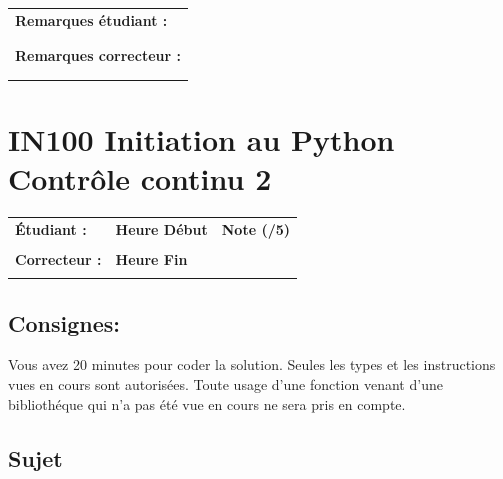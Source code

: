 \documentclass[a4paper,11pt]{article}
\begin{document}
\vspace{1 cm}

\begin{table}[h!]
\centering
\renewcommand{\arraystretch}{1.4} %
\begin{tabular}{|p{15cm}|}
\hline
\textbf{Remarques étudiant :}    \\
 \\
 \\
\hline
\textbf{Remarques correcteur :}  \\
 \\
 \\
\hline
\end{tabular}
\end{table}

\newpage

\section*{\center IN100 Initiation au Python\\
Contrôle continu 2}


\begin{table}[h!]
\centering
\renewcommand{\arraystretch}{1.4} %
\begin{tabular}{|p{10cm}|p{3cm}|p{2cm}|}
\hline
\textbf{Étudiant :} & \textbf{Heure Début }  & \textbf{Note (/5) }  \\
& & \\
\hline
\textbf{Correcteur :} & \textbf{Heure Fin } & \\
& & \\
\hline

\hline
\end{tabular}
\end{table}
\vspace{-0.3 cm}
\subsection*{Consignes:} Vous avez 20 minutes pour coder la solution. Seules les types et les instructions vues en cours sont autorisées. Toute usage d'une fonction 
venant d'une bibliothéque qui n'a pas été vue en cours ne sera pris en compte. 


\subsection*{Sujet}
\end{document}

